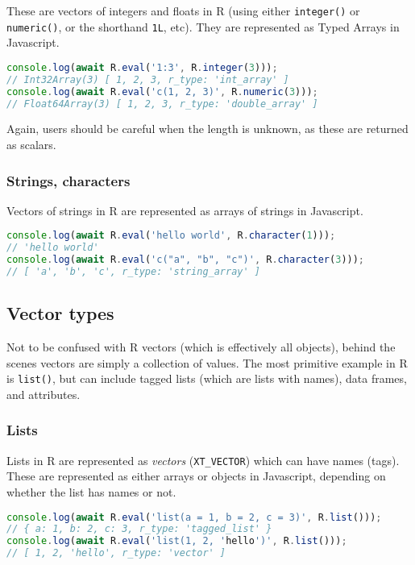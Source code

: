 \documentclass{article}
\newcommand{\cmd}[1]{\texttt{#1}}
\newcommand{\prog}[1]{{\sf #1}}
\newcommand{\R}{\prog{R}}
\begin{document}
These are vectors of integers and floats in \R{} (using either \cmd{integer()} or \cmd{numeric()}, or the shorthand \cmd{1L}, etc).
They are represented as Typed Arrays in Javascript.

\begin{lstlisting}[language=Javascript, numbers=none]
console.log(await R.eval('1:3', R.integer(3)));
// Int32Array(3) [ 1, 2, 3, r_type: 'int_array' ]
console.log(await R.eval('c(1, 2, 3)', R.numeric(3)));
// Float64Array(3) [ 1, 2, 3, r_type: 'double_array' ]
\end{lstlisting}

Again, users should be careful when the length is unknown, as these are returned as scalars.

\subsubsection{Strings, characters}
\label{sec:character}

Vectors of strings in \R{} are represented as arrays of strings in Javascript.
\begin{lstlisting}[language=Javascript, numbers=none]
console.log(await R.eval('hello world', R.character(1)));
// 'hello world'
console.log(await R.eval('c("a", "b", "c")', R.character(3)));
// [ 'a', 'b', 'c', r_type: 'string_array' ]
\end{lstlisting}

\subsection{Vector types}
\label{sec:vectors}

Not to be confused with \R{} vectors (which is effectively all objects), behind the scenes vectors are simply a collection of values.
The most primitive example in \R{} is \cmd{list()}, but can include tagged lists (which are lists with names), data frames, and attributes.

\subsubsection{Lists}
\label{sec:lists}

Lists in \R{} are represented as \emph{vectors} (\cmd{XT\_VECTOR}) which can have names (tags).
These are represented as either arrays or objects in Javascript, depending on whether the list has names or not.
\begin{lstlisting}[language=Javascript, numbers=none]
console.log(await R.eval('list(a = 1, b = 2, c = 3)', R.list()));
// { a: 1, b: 2, c: 3, r_type: 'tagged_list' }
console.log(await R.eval('list(1, 2, 'hello')', R.list()));
// [ 1, 2, 'hello', r_type: 'vector' ]
\end{lstlisting}
\end{document}
